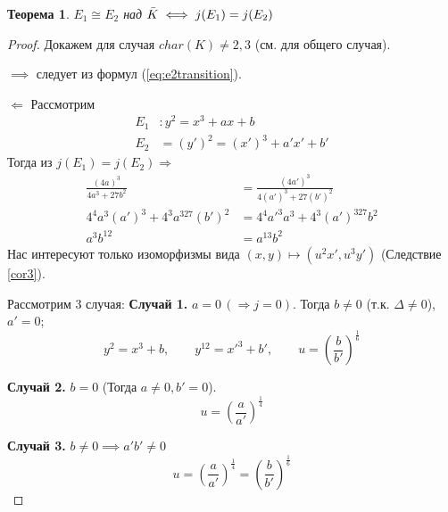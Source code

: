 \documentclass[12pt]{article}
\newtheorem{theorem}{Теорема}
\theoremstyle{definition}
\theoremstyle{definition}
\theoremstyle{definition}
\begin{document}
            \begin{theorem}
                $E_1 \cong E_2$ над $\Bar{K} \iff j(E_1)=j(E_2)$
            \end{theorem}
            \begin{proof}
                Докажем для случая $char(K)\neq 2,3$ (см. \cite{silverman} для общего случая).
                
                $\implies$ следует из формул (\ref{eq:e2transition}).
                
                $\Longleftarrow$ Рассмотрим
                \begin{align*}
                    E_1&:y^2=x^3+ax+b \\
                    E_2&=(y')^2 = (x')^3+a'x'+b'
                \end{align*}
                Тогда из $j(E_1)=j(E_2) \Rightarrow$
                \begin{align*}
                    \frac{(4a)^3}{4a^3+27b^2} &= \frac{(4a')^3}{4(a')^3+27(b')^2} \\
                    4^4a^3(a')^3 + 4^3a^327(b')^2 &= 4^4 a'^3a^3 + 4^3(a')^327b^2 \\
                    a^3b^{12} &= a^{13}b^2 \tag{*}
                \end{align*}
                Нас интересуют только изоморфизмы вида $(x,y)\mapsto(u^2x', u^3y')$ (Следствие \ref{cor3}).

                Рассмотрим 3 случая: \newline
                \textbf{Случай 1.} $a = 0 \,(\Rightarrow j=0)$. Тогда $b\neq0$ (т.к. $\Delta \neq0$), $a'=0$;
                \begin{equation*}
                    y^2=x^3+b, \quad \quad y^{12} = x'^3 + b', \quad \quad u=\left(\frac{b}{b'}\right)^{\frac{1}{6}}
                \end{equation*}
                
                \textbf{Случай 2.} $b=0$ (Тогда $a \neq 0, b' = 0$).
                \[
                     u = \left(\frac{a}{a'}\right)^{\frac{1}{4}}
                \]
                
                \textbf{Случай 3.} $b\neq0 \implies a'b' \neq0$ 
                \[
                    u = \left(\frac{a}{a'}\right)^{\frac{1}{4}} = \left(\frac{b}{b'}\right)^{\frac{1}{6}}
                \]
            \end{proof}
            
\end{document}
